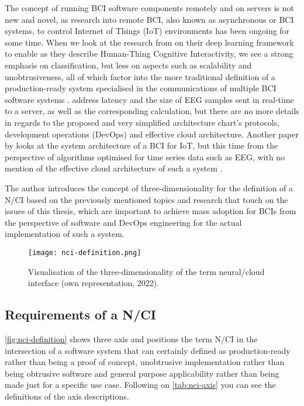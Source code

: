 The concept of running BCI software components remotely and on servers is not new and novel, as research into remote BCI, also known as asynchronous or BCI systems, to control Internet of Things (IoT) environments has been ongoing for some time. When we look at the research from \citeauthor{zhang_internet_2018} on their deep learning framework to enable as they describe Human-Thing Cognitive Interactivity, we see a strong emphasis on classification, but less on aspects such as scalability and unobtrusiveness, all of which factor into the more traditional definition of a production-ready system specialised in the communications of multiple BCI software systems \citep{zhang_internet_2018}. \citeauthor{zhang_internet_2018} address latency and the size of EEG samples sent in real-time to a server, as well as the corresponding calculation, but there are no more details in regards to the proposed and very simplified architecture chart's protocols, development operations (DevOps) and effective cloud architecture. Another paper by \citeauthor{ahamad_system_2022} looks at the system architecture of a BCI for IoT, but this time from the perspective of algorithms optimised for time series data such as EEG, with no mention of the effective cloud architecture of such a system \citep{ahamad_system_2022}.

The author introduces the concept of three-dimensionality for the definition of a N/CI based on the previously mentioned topics and research that touch on the issues of this thesis, which are important to achieve mass adoption for BCIs from the perspective of software and DevOps engineering for the actual implementation of such a system.

\begin{figure}[!ht]
  \centering
  \texttt{[image: nci-definition.png]}
  \caption{Visualisation of the three-dimensionality of the term neural/cloud interface (own representation, 2022).}
  \label{fig:nci-definition}
\end{figure}

\subsection{Requirements of a N/CI}
\label{chapter2-requirements-of-a-nci}

\autoref{fig:nci-definition} shows three axis and positions the term N/CI in the intersection of a software system that can certainly defined as production-ready rather than being a proof of concept, unobtrusive implementation rather than being obtrusive software and general purpose applicability rather than being made just for a specific use case. Following on \autoref{tab:nci-axis} you can see the definitions of the axis descriptions.

